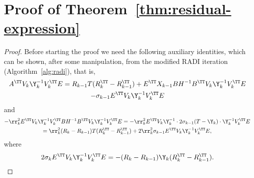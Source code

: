
\section{Proof of Theorem~\ref{thm:residual-expression}}\label{append:proof-residual-expression}

\begin{proof}

Before starting the proof we need the following auxiliary identities, which can
be shown, after some manipulation, from the modified RADI iteration
(Algorithm~\ref{alg:radi}), that is,
\begin{multline}\label{eq:AVkYinvVkT}
	A^\TT V_k\Y_k^{-1}V_k^\TT E
	= R_{k-1}T(R_k^\TT-R_{k-1}^\TT)
	+ E^\TT X_{k-1}BH^{-1}B^\TT V_k\Y_k^{-1}V_k^\TT E\\
	- \sigma_{k-1} E^\TT V_k\Y_k^{-1}V_k^\TT E
\end{multline}
and
\begin{multline}\label{eq:long-symterm}
	-\rr_k^2 E^\TT V_k\Y_k^{-1}V_k^\TT B H^{-1} B^\TT  V_k\Y_k^{-1}V^\TT_k E
	= -\rr_k^2 E^\TT V_k\Y_k^{-1}\cdot 2\sigma_{k-1}(T-\Y_k) \cdot \Y_k^{-1}V^\TT_k E \\
	= \rr_k^2(R_k-R_{k-1})T(R_k^\TT-R_{k-1}^\TT) +
	2\rr_k^2\sigma_{k-1}E^\TT V_k\Y_k^{-1}V_k^\TT E,
\end{multline}
where
\begin{equation}\label{eq:Re-symterm}
	2\sigma_k E^\TT V_k\Y_k^{-1}V_k^\TT E =-(R_k-R_{k-1})\Y_k(R_k^\TT-R_{k-1}^\TT).
\end{equation}


\end{proof}
